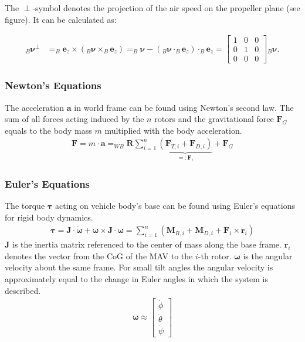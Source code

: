 The $\perp$-symbol denotes the projection of the air speed on the propeller plane (see figure). It can be calculated as:

\begin{align}
_B\mathbf{\boldsymbol{\nu}}^\perp &= _B\mathbf{e}_z \times (_B\mathbf{\boldsymbol{\nu}} \times _B\mathbf{e}_z) = _B\mathbf{\boldsymbol{\nu}} - ( _B\mathbf{\boldsymbol{\nu}} \cdot _B\mathbf{e}_z) \cdot _B\mathbf{e}_z 
=\begin{bmatrix}
1 & 0 & 0 \\
0 & 1 & 0 \\
0 & 0 & 0
\end{bmatrix} {_B\mathbf{\boldsymbol{\nu}}} \label{eq:projection}.
\end{align}

\subsubsection{Newton's Equations}
The acceleration $\mathbf{a}$ in world frame can be found using Newton's second law. The sum of all forces acting induced by the $n$ rotors and the gravitational force $\mathbf{F}_G$ equals to the body mass $m$ multiplied with the body acceleration.
\begin{align}
\mathbf{F} = m \cdot \mathbf{a} = _{WB}\mathbf{R} \sum_{i=1}^n \underbrace{\left(\mathbf{F}_{T,i} + \mathbf{F}_{D,i} \right)}_{=:\mathbf{F}_i} + \mathbf{F}_G \label{eq:newton}
\end{align}

\subsubsection{Euler's Equations}
The torque $\boldsymbol{\tau}$ acting on vehicle body's base can be found using Euler's equations for rigid body dynamics.
\begin{align}
\boldsymbol{\tau} = \mathbf{J} \cdot  \mathbf{\dot{\boldsymbol{\omega}}} + \boldsymbol{\omega} \times \mathbf{J} \cdot \boldsymbol{\omega} = \sum_{i=1}^n \left( \mathbf{M}_{R,i}+ \mathbf{M}_{D,i} + \mathbf{F}_i \times \mathbf{r}_i \right)  \label{eq:euler}
\end{align}
$\mathbf{J}$  is the inertia matrix referenced to the center of mass along the base frame. $\mathbf{r}_i$ denotes the vector from the CoG of the MAV to the $i$-th rotor. $\boldsymbol{\omega}$ is the angular velocity about the same frame. For small tilt angles the angular velocity is approximately equal to the change in Euler angles in which the system is described.
\begin{align}
\boldsymbol{\omega} \approx \begin{bmatrix}
\dot\phi \\ \dot\theta \\ \dot\psi
\end{bmatrix}
\end{align}


